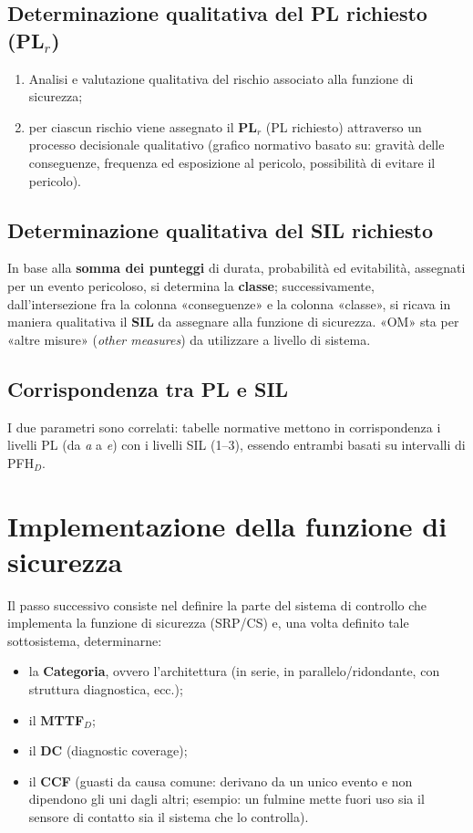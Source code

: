 \subsection{Determinazione qualitativa del PL richiesto (PL$_r$)}
\begin{enumerate}
    \item Analisi e valutazione qualitativa del rischio associato alla funzione di sicurezza;
    \item per ciascun rischio viene assegnato il \textbf{PL$_r$} (PL richiesto) attraverso un processo decisionale qualitativo (grafico normativo basato su: gravità delle conseguenze, frequenza ed esposizione al pericolo, possibilità di evitare il pericolo).
\end{enumerate}

\subsection{Determinazione qualitativa del SIL richiesto}
In base alla \textbf{somma dei punteggi} di durata, probabilità ed evitabilità, assegnati per un evento pericoloso, si determina la \textbf{classe}; successivamente, dall'intersezione fra la colonna «conseguenze» e la colonna «classe», si ricava in maniera qualitativa il \textbf{SIL} da assegnare alla funzione di sicurezza. «OM» sta per «altre misure» (\emph{other measures}) da utilizzare a livello di sistema.

\subsection{Corrispondenza tra PL e SIL}
I due parametri sono correlati: tabelle normative mettono in corrispondenza i livelli PL (da \emph{a} a \emph{e}) con i livelli SIL (1--3), essendo entrambi basati su intervalli di PFH$_D$.

\section{Implementazione della funzione di sicurezza}
Il passo successivo consiste nel definire la parte del sistema di controllo che implementa la funzione di sicurezza (SRP/CS) e, una volta definito tale sottosistema, determinarne:
\begin{itemize}
    \item la \textbf{Categoria}, ovvero l'architettura (in serie, in parallelo/ridondante, con struttura diagnostica, ecc.);
    \item il \textbf{MTTF$_D$};
    \item il \textbf{DC} (diagnostic coverage);
    \item il \textbf{CCF} (guasti da causa comune: derivano da un unico evento e non dipendono gli uni dagli altri; esempio: un fulmine mette fuori uso sia il sensore di contatto sia il sistema che lo controlla).
\end{itemize}

